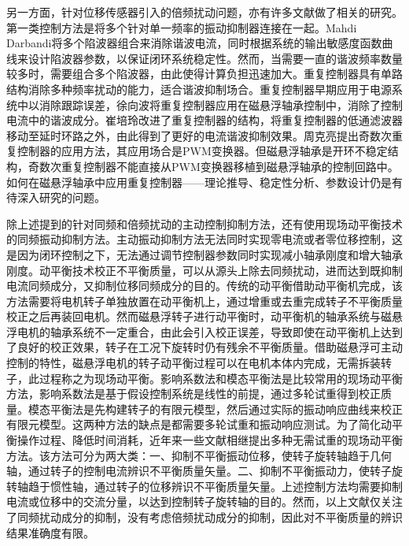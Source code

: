 \documentclass[
  lang=cn,
  degree=master,
  openany,oneside
]{nuaathesis}
\begin{document}
另一方面，针对位移传感器引入的倍频扰动问题，亦有许多文献做了相关的研究。第一类控制方法是将多个针对单一频率的振动抑制器连接在一起。Mahdi Darbandi将多个陷波器组合来消除谐波电流，同时根据系统的输出敏感度函数曲线来设计陷波器参数，以保证闭环系统稳定性\cite{mahdi2017harmonic}。然而，当需要一直的谐波频率数量较多时，需要组合多个陷波器，由此使得计算负担迅速加大。重复控制器具有单路结构消除多种频率扰动的能力，适合谐波抑制场合。重复控制器早期应用于电源系统中以消除跟踪误差\cite{zhou2008plug}，徐向波将重复控制器应用在磁悬浮轴承控制中，消除了控制电流中的谐波成分\cite{xu2015model}。崔培玲改进了重复控制器的结构，将重复控制器的低通滤波器移动至延时环路之外，由此得到了更好的电流谐波抑制效果\cite{cui2016suppression}。周克亮提出奇数次重复控制器的应用方法，其应用场合是PWM变换器\cite{zhou2006zero}。但磁悬浮轴承是开环不稳定结构，奇数次重复控制器不能直接从PWM变换器移植到磁悬浮轴承的控制回路中。如何在磁悬浮轴承中应用重复控制器——理论推导、稳定性分析、参数设计仍是有待深入研究的问题。

除上述提到的针对同频和倍频扰动的主动控制抑制方法，还有使用现场动平衡技术的同频振动抑制方法。主动振动抑制方法无法同时实现零电流或者零位移控制，这是因为闭环控制之下，无法通过调节控制器参数同时实现减小轴承刚度和增大轴承刚度。动平衡技术校正不平衡质量，可以从源头上除去同频扰动，进而达到既抑制电流同频成分，又抑制位移同频成分的目的。传统的动平衡借助动平衡机完成，该方法需要将电机转子单独放置在动平衡机上，通过增重或去重完成转子不平衡质量校正之后再装回电机。然而磁悬浮转子进行动平衡时，动平衡机的轴承系统与磁悬浮电机的轴承系统不一定重合，由此会引入校正误差，导致即使在动平衡机上达到了良好的校正效果，转子在工况下旋转时仍有残余不平衡质量。借助磁悬浮可主动控制的特性，磁悬浮电机的转子动平衡过程可以在电机本体内完成，无需拆装转子，此过程称之为现场动平衡。影响系数法和模态平衡法是比较常用的现场动平衡方法，影响系数法是基于假设控制系统是线性的前提，通过多轮试重得到校正质量\cite{john2009relationship,ranjan2019application}。模态平衡法是先构建转子的有限元模型，然后通过实际的振动响应曲线来校正有限元模型。这两种方法的缺点是都需要多轮试重和振动响应测试\cite{wang2014field}。为了简化动平衡操作过程、降低时间消耗，近年来一些文献相继提出多种无需试重的现场动平衡方法。该方法可分为两大类：一、抑制不平衡振动位移，使转子旋转轴趋于几何轴，通过转子的控制电流辨识不平衡质量矢量\cite{fang2013field,liu2015field}。二、抑制不平衡振动力，使转子旋转轴趋于惯性轴，通过转子的位移辨识不平衡质量矢量\cite{xu2015field}。上述控制方法均需要抑制电流或位移中的交流分量，以达到控制转子旋转轴的目的。然而，以上文献仅关注了同频扰动成分的抑制，没有考虑倍频扰动成分的抑制，因此对不平衡质量的辨识结果准确度有限。
\end{document}
